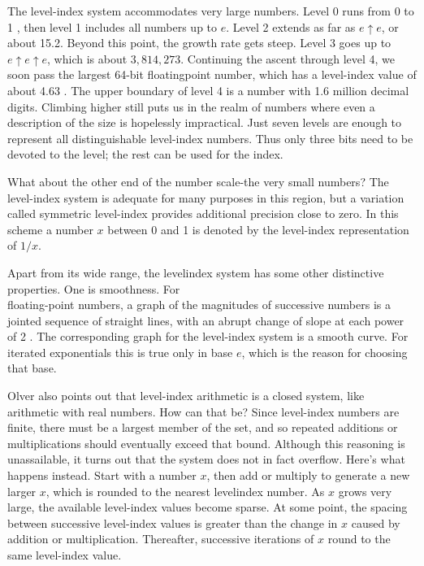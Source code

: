 \documentclass[10pt]{article}
\begin{document}
The level-index system accommodates very large numbers. Level 0 runs from 0 to 1 , then level 1 includes all numbers up to $e$. Level 2 extends as far as $e \uparrow e$, or about 15.2. Beyond this point, the growth rate gets steep. Level 3 goes up to $e \uparrow e \uparrow e$, which is about $3,814,273$. Continuing the ascent through level 4, we soon pass the largest 64-bit floatingpoint number, which has a level-index value of about 4.63 . The upper boundary of level 4 is a number with 1.6 million decimal digits. Climbing higher still puts us in the realm of numbers where even a description of the size is hopelessly impractical. Just seven levels are enough to represent all distinguishable level-index numbers. Thus only three bits need to be devoted to the level; the rest can be used for the index.

What about the other end of the number scale-the very small numbers? The level-index system is adequate for many purposes in this region, but a variation called symmetric level-index provides additional precision close to zero. In this scheme a number $x$ between 0 and 1 is denoted by the level-index representation of $1 / x$.

Apart from its wide range, the levelindex system has some other distinctive properties. One is smoothness. For\\
floating-point numbers, a graph of the magnitudes of successive numbers is a jointed sequence of straight lines, with an abrupt change of slope at each power of 2 . The corresponding graph for the level-index system is a smooth curve. For iterated exponentials this is true only in base $e$, which is the reason for choosing that base.

Olver also points out that level-index arithmetic is a closed system, like arithmetic with real numbers. How can that be? Since level-index numbers are finite, there must be a largest member of the set, and so repeated additions or multiplications should eventually exceed that bound. Although this reasoning is unassailable, it turns out that the system does not in fact overflow. Here's what happens instead. Start with a number $x$, then add or multiply to generate a new larger $x$, which is rounded to the nearest levelindex number. As $x$ grows very large, the available level-index values become sparse. At some point, the spacing between successive level-index values is greater than the change in $x$ caused by addition or multiplication. Thereafter, successive iterations of $x$ round to the same level-index value.
\end{document}
